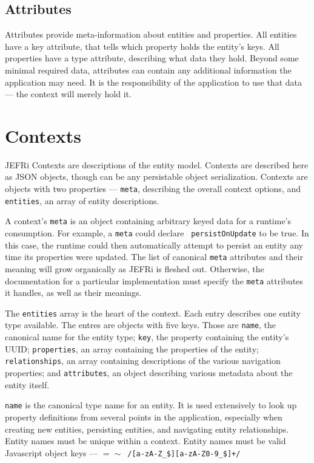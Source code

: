 \documentclass{article}
\newcommand{\ilcode}{\tt}
\begin{document}
\subsection{Attributes}

Attributes provide meta-information about entities and properties. All entities
have a key attribute, that tells which property holds the entity's keys. All
properties have a type attribute, describing what data they hold. Beyond some
minimal required data, attributes can contain any additional information the
application may need. It is the responsibility of the application to use that
data --- the context will merely hold it.

\section{Contexts}

JEFRi Contexts are descriptions of the entity model. Contexts are described here
as JSON objects, though can be any persistable object serialization. Contexts
are objects with two properties --- {\ilcode meta}, describing the overall
context options, and {\tt entities}, an array of entity descriptions.

A context's {\ilcode meta} is an object containing arbitrary keyed data for a
runtime's consumption. For example, a {\ilcode meta} could declare {\ilcode
persistOnUpdate} to be true. In this case, the runtime could then automatically
attempt to persist an entity any time its properties were updated. The list of
canonical {\ilcode meta} attributes and their meaning will grow organically as
JEFRi is fleshed out. Otherwise, the documentation for a particular
implementation must specify the {\ilcode meta} attributes it handles, as well as
their meanings.

The {\ilcode entities} array is the heart of the context. Each entry describes
one entity type available. The entres are objects with five keys. Those are
{\ilcode name}, the canonical name for the entity type; {\ilcode key}, the
property containing the entity's UUID; {\ilcode properties}, an array containing
the properties of the entity; {\ilcode relationships}, an array containing
descriptions of the various navigation properties; and {\ilcode attributes}, an
object describing various metadata about the entity itself.

{\ilcode name} is the canonical type name for an entity. It is used extensively
to look up property definitions from several points in the application,
especially when creating new entities, persisting entities, and navigating
entity relationships. Entity names must be unique within a context. Entity names
must be valid Javascript object keys --- {\ilcode $=\sim$
/[a-zA-Z\_\$][a-zA-Z0-9\_\$]+/}
\end{document}
